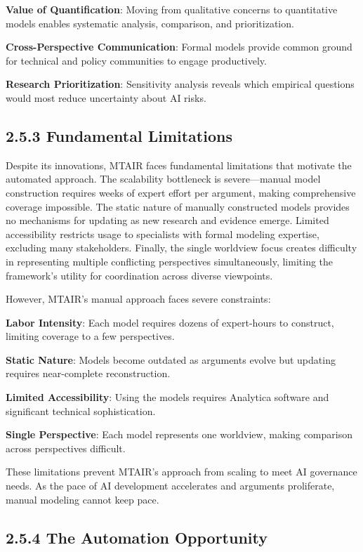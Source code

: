 \documentclass[
  11pt,
  letterpaper,
]{book}
\begin{document}
\textbf{Value of Quantification}: Moving from qualitative concerns to
quantitative models enables systematic analysis, comparison, and
prioritization.

\textbf{Cross-Perspective Communication}: Formal models provide common
ground for technical and policy communities to engage productively.

\textbf{Research Prioritization}: Sensitivity analysis reveals which
empirical questions would most reduce uncertainty about AI risks.

\subsection*{2.5.3 Fundamental Limitations}\label{sec-mtair-limitations}

Despite its innovations, MTAIR faces fundamental limitations that
motivate the automated approach. The scalability bottleneck is
severe---manual model construction requires weeks of expert effort per
argument, making comprehensive coverage impossible. The static nature of
manually constructed models provides no mechanisms for updating as new
research and evidence emerge. Limited accessibility restricts usage to
specialists with formal modeling expertise, excluding many stakeholders.
Finally, the single worldview focus creates difficulty in representing
multiple conflicting perspectives simultaneously, limiting the
framework's utility for coordination across diverse viewpoints.

However, MTAIR's manual approach faces severe constraints:

\textbf{Labor Intensity}: Each model requires dozens of expert-hours to
construct, limiting coverage to a few perspectives.

\textbf{Static Nature}: Models become outdated as arguments evolve but
updating requires near-complete reconstruction.

\textbf{Limited Accessibility}: Using the models requires Analytica
software and significant technical sophistication.

\textbf{Single Perspective}: Each model represents one worldview, making
comparison across perspectives difficult.

These limitations prevent MTAIR's approach from scaling to meet AI
governance needs. As the pace of AI development accelerates and
arguments proliferate, manual modeling cannot keep pace.

\subsection*{2.5.4 The Automation
Opportunity}\label{sec-automation-opportunity}
\end{document}
